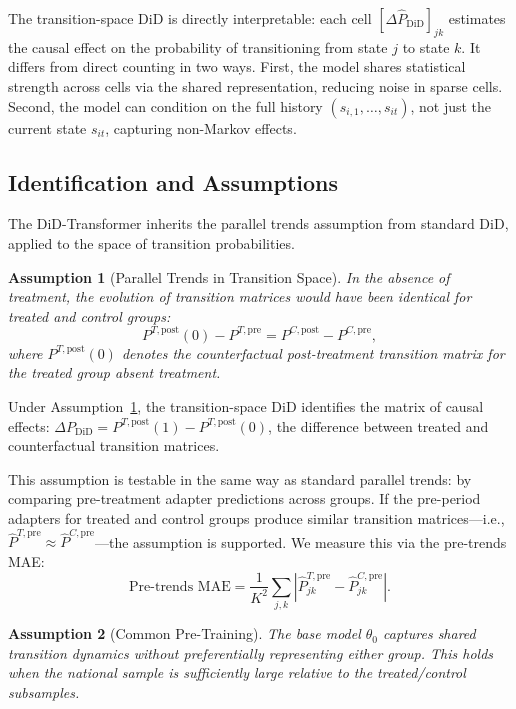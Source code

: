 \documentclass[12pt]{article}
\newtheorem{assumption}{Assumption}
\begin{document}
The transition-space DiD is directly interpretable: each cell $[\Delta \hat{P}_{\text{DiD}}]_{jk}$ estimates the causal effect on the probability of transitioning from state $j$ to state $k$. It differs from direct counting in two ways. First, the model shares statistical strength across cells via the shared representation, reducing noise in sparse cells. Second, the model can condition on the full history $(s_{i,1}, \ldots, s_{it})$, not just the current state $s_{it}$, capturing non-Markov effects.

\subsection{Identification and Assumptions}\label{subsec:assumptions}

The DiD-Transformer inherits the parallel trends assumption from standard DiD, applied to the space of transition probabilities.

\begin{assumption}[Parallel Trends in Transition Space]\label{assumption:pt}
In the absence of treatment, the evolution of transition matrices would have been identical for treated and control groups:
\begin{equation}
P^{T,\text{post}}(0) - P^{T,\text{pre}} = P^{C,\text{post}} - P^{C,\text{pre}},
\end{equation}
where $P^{T,\text{post}}(0)$ denotes the counterfactual post-treatment transition matrix for the treated group absent treatment.
\end{assumption}

Under Assumption~\ref{assumption:pt}, the transition-space DiD identifies the matrix of causal effects: $\Delta P_{\text{DiD}} = P^{T,\text{post}}(1) - P^{T,\text{post}}(0)$, the difference between treated and counterfactual transition matrices.

This assumption is testable in the same way as standard parallel trends: by comparing pre-treatment adapter predictions across groups. If the pre-period adapters for treated and control groups produce similar transition matrices---i.e., $\hat{P}^{T,\text{pre}} \approx \hat{P}^{C,\text{pre}}$---the assumption is supported. We measure this via the pre-trends MAE:
\begin{equation}
\text{Pre-trends MAE} = \frac{1}{K^2} \sum_{j,k} |\hat{P}^{T,\text{pre}}_{jk} - \hat{P}^{C,\text{pre}}_{jk}|.
\end{equation}

\begin{assumption}[Common Pre-Training]\label{assumption:pretraining}
The base model $\theta_0$ captures shared transition dynamics without preferentially representing either group. This holds when the national sample is sufficiently large relative to the treated/control subsamples.
\end{assumption}
\end{document}
